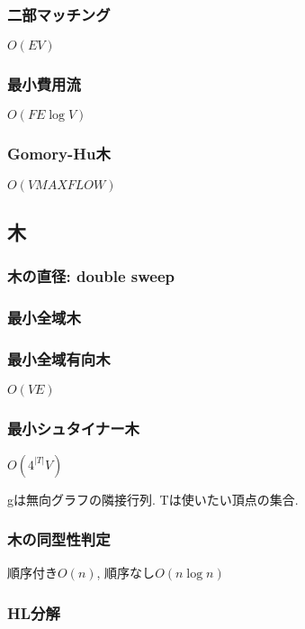\subsubsection{二部マッチング}
$O(EV)$\par


\subsubsection{最小費用流}
$O(FE\log V)$\par


\subsubsection{Gomory-Hu木}
$O(V MAXFLOW)$


\subsection{木}
\subsubsection{木の直径: double sweep}
\subsubsection{最小全域木}

\subsubsection{最小全域有向木}
$O(VE)$

\subsubsection{最小シュタイナー木}
$O(4^{|T|}V)$ \par
gは無向グラフの隣接行列. Tは使いたい頂点の集合.\par

\subsubsection{木の同型性判定}
順序付き$O(n)$, 順序なし$O(n\log n)$


\subsubsection{HL分解}


